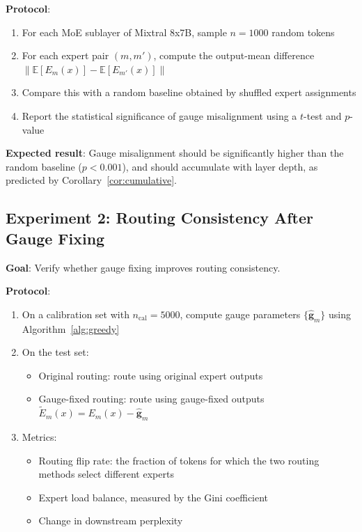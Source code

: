 \documentclass[12pt,a4paper]{article}
\theoremstyle{remark}
\newcommand{\E}{\mathbb{E}}
\begin{document}
\textbf{Protocol}:
\begin{enumerate}
    \item For each MoE sublayer of Mixtral 8x7B, sample $n=1000$ random tokens
    \item For each expert pair $(m, m')$, compute the output-mean difference $\| \E[E_m(x)] - \E[E_{m'}(x)] \|$
    \item Compare this with a random baseline obtained by shuffled expert assignments
    \item Report the statistical significance of gauge misalignment using a $t$-test and $p$-value
\end{enumerate}

\textbf{Expected result}: Gauge misalignment should be significantly higher than the random baseline ($p < 0.001$), and should accumulate with layer depth, as predicted by Corollary~\ref{cor:cumulative}.

\subsection{Experiment 2: Routing Consistency After Gauge Fixing}

\textbf{Goal}: Verify whether gauge fixing improves routing consistency.

\textbf{Protocol}:
\begin{enumerate}
    \item On a calibration set with $n_{\text{cal}}=5000$, compute gauge parameters $\{\hat{\mathbf{g}}_m\}$ using Algorithm~\ref{alg:greedy}
    \item On the test set:
        \begin{itemize}
            \item Original routing: route using original expert outputs
            \item Gauge-fixed routing: route using gauge-fixed outputs $\tilde{E}_m(x) = E_m(x) - \hat{\mathbf{g}}_m$
        \end{itemize}
    \item Metrics:
        \begin{itemize}
            \item Routing flip rate: the fraction of tokens for which the two routing methods select different experts
            \item Expert load balance, measured by the Gini coefficient
            \item Change in downstream perplexity
        \end{itemize}
\end{enumerate}
\end{document}
